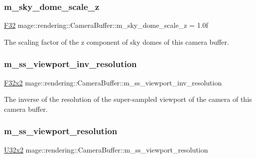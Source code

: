 \subsubsection{\texorpdfstring{m\+\_\+sky\+\_\+dome\+\_\+scale\+\_\+z}{m\_sky\_dome\_scale\_z}}
{\footnotesize\ttfamily \mbox{\hyperlink{namespacemage_aa97e833b45f06d60a0a9c4fc22ae02c0}{F32}} mage\+::rendering\+::\+Camera\+Buffer\+::m\+\_\+sky\+\_\+dome\+\_\+scale\+\_\+z = 1.\+0f}

The scaling factor of the z component of sky domes of this camera buffer. \mbox{\label{structmage_1_1rendering_1_1_camera_buffer_a4695806d4ea3e7af5beeba043f7e9212}} 
\subsubsection{\texorpdfstring{m\+\_\+ss\+\_\+viewport\+\_\+inv\+\_\+resolution}{m\_ss\_viewport\_inv\_resolution}}
{\footnotesize\ttfamily \mbox{\hyperlink{namespacemage_aee4759dedc8def6c6dec26b5c7eddf29}{F32x2}} mage\+::rendering\+::\+Camera\+Buffer\+::m\+\_\+ss\+\_\+viewport\+\_\+inv\+\_\+resolution}

The inverse of the resolution of the super-\/sampled viewport of the camera of this camera buffer. \mbox{\label{structmage_1_1rendering_1_1_camera_buffer_a96b17352187228ee2265be33d3f2d159}} 
\subsubsection{\texorpdfstring{m\+\_\+ss\+\_\+viewport\+\_\+resolution}{m\_ss\_viewport\_resolution}}
{\footnotesize\ttfamily \mbox{\hyperlink{namespacemage_ae5e7ccf8a1785baaacf57b3a0f4324e2}{U32x2}} mage\+::rendering\+::\+Camera\+Buffer\+::m\+\_\+ss\+\_\+viewport\+\_\+resolution}

